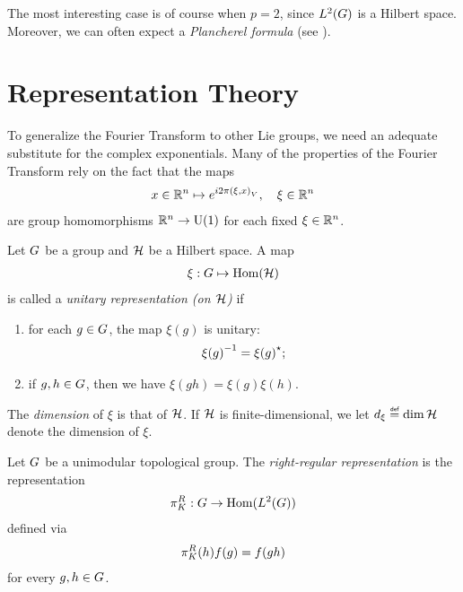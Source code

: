The most interesting case is of course when $p = 2$,
since ${L^{2} (G)}$ is a Hilbert space.
Moreover,
we can often expect a \emph{Plancherel formula}
(see \cite[Subsection 1.8.2]{FischerRuzhansky16}).

\section{Representation Theory}

To generalize the Fourier Transform to other Lie groups,
we need an adequate substitute for the complex exponentials.
Many of the properties of the Fourier Transform rely on the fact that the maps
\begin{align*}
    x \in \mathbb{R}^n \mapsto e^{i 2 \pi {\left(\xi, x\right)_{V}}},
    \quad \xi \in \mathbb{R}^n
\end{align*}
are group homomorphisms $\mathbb{R}^n \to {\mathrm{U} (1)}$ for each fixed $\xi \in \mathbb{R}^n$.

\begin{definition}
\label{definition:unitary_representation}
    Let $G$ be a group and $\mathcal{H}$ be a Hilbert space.
    A map
    \begin{align*}
        \xi : G \mapsto \operatorname{Hom}(\mathcal{H})
    \end{align*}
    is called a \emph{unitary representation (on $\mathcal{H}$)} if
    \begin{enumerate}
        \item for each $g \in G$, the map $\xi(g)$ is unitary:
            \begin{align*}
                {\xi(g)}^{-1} = {\xi(g)}^\star;
            \end{align*}
        \item if $g, h \in G$, then we have $\xi(g h) = \xi(g) \xi(h)$.
    \end{enumerate}

    The \emph{dimension} of $\xi$ is that of $\mathcal{H}$.
    If $\mathcal{H}$ is finite-dimensional,
    we let $\dimRep{\xi} \defeq \dim{\Hil}$ denote the dimension of $\xi$.
\end{definition}

\begin{example}
    Let $G$ be a unimodular topological group.
    The \emph{right-regular representation} is the representation
    \begin{align*}
        \pi^R_{K} : G \to \operatorname{Hom}({L^{2} (G)})
    \end{align*}
    defined via
    \begin{align*}
        \pi^R_{K}(h) f(g) = f(g h)
    \end{align*}
    for every $g, h \in G$.
\end{example}

